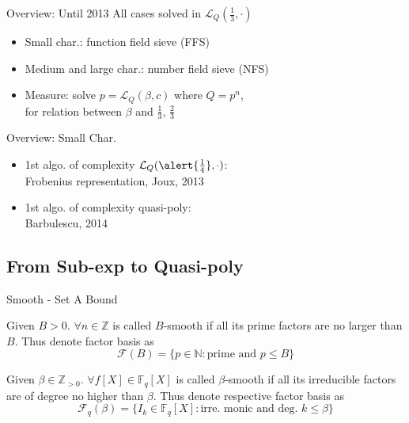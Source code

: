 \documentclass{beamer}
\begin{document}
		\begin{frame}{Overview: Until 2013}
			All cases solved in $\mathcal{L}_Q(\frac{1}{3}, \cdot)$
			\begin{itemize}
				\item
					Small char.: function field sieve (FFS)
				\item	
					Medium and large char.: number field sieve (NFS)
				\item
					Measure: solve $p = \mathcal{L}_Q(\beta, c)$ where $Q = p^n$,\\
					for relation between $\beta$ and $\frac{1}{3}$, $\frac{2}{3}$ %
			\end{itemize}
		\end{frame}

		\begin{frame}{Overview: Small Char.}
			\begin{itemize}
				\item
					1st algo. of complexity $\mathcal{L}_Q(\alert{\frac{1}{4}}, \cdot)$:\\
					Frobenius representation, Joux, 2013
				\item
					1st algo. of complexity \alert{quasi-poly}:\\
					Barbulescu, 2014 %
			\end{itemize}
		\end{frame}
	\subsection{From Sub-exp to Quasi-poly}

		\begin{frame}{Smooth - Set A Bound}
			\begin{definition}
				Given $B>0$. 
				$\forall n\in\mathbb{Z}$ is called \alert{$B$-smooth} if all its prime factors are no larger than $B$. 
				Thus denote \alert{factor basis} as
				$$\mathcal{F}(B) = \{ p\in\mathbb{N}: \text{prime and } p\leq B\}$$
			\end{definition}
			\begin{definition}
				Given $\beta\in\mathbb{Z}_{>0}$.
				$\forall f[X]\in\mathbb{F}_q[X]$ is called \alert{$\beta$-smooth} if all its irreducible factors are of degree no higher than $\beta$.
				Thus denote respective \alert{factor basis} as
				$$\mathcal{F}_q(\beta) = \{ I_k\in\mathbb{F}_q[X]: \text{irre. monic and deg. } k\leq \beta\}$$
			\end{definition}
		\end{frame}
\end{document}

